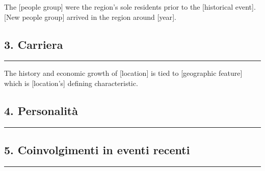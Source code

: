 The {[}people group{]} were the region's sole residents prior to the
{[}historical event{]}. {[}New people group{]} arrived in the region
around {[}year{]}.

\subsection{3. Carriera}\label{carriera}

\begin{center}\rule{0.5\linewidth}{0.5pt}\end{center}

The history and economic growth of {[}location{]} is tied to
{[}geographic feature{]} which is {[}location's{]} defining
characteristic.

\subsection{4. Personalità}\label{personalituxe0}

\begin{center}\rule{0.5\linewidth}{0.5pt}\end{center}

\subsection{5. Coinvolgimenti in eventi
recenti}\label{coinvolgimenti-in-eventi-recenti}

\begin{center}\rule{0.5\linewidth}{0.5pt}\end{center}

\href{Untitled\%20565753f2add843788cf272a336fd092f.csv}{}

